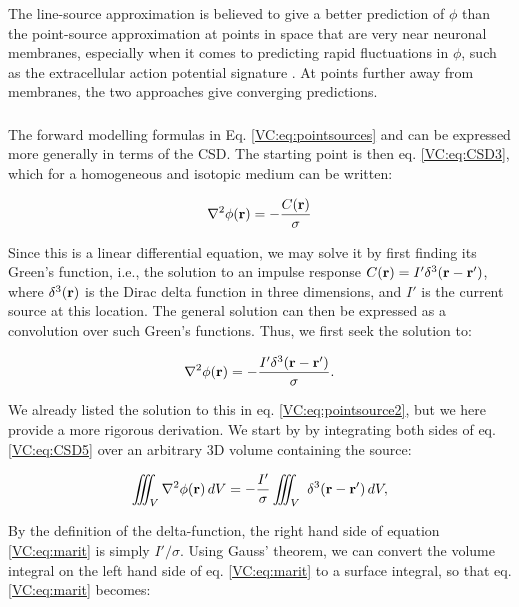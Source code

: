 The line-source approximation is believed to give a better prediction of $\phi$ than the point-source approximation at points in space that are very near neuronal membranes, especially when it comes to predicting rapid fluctuations in $\phi$, such as the extracellular action potential signature \citep{Holt1999}. At points further away from membranes, the two approaches give converging predictions.


\subsubsection{}
The forward modelling formulas in Eq. \ref{VC:eq:pointsources} and \label{VC:eq:linesources} can be expressed more generally in terms of the CSD. The starting point is then eq. \ref{VC:eq:CSD3}, which for a homogeneous and isotopic medium can be written: 

\begin{equation}
\nabla^2 \phi({\bf r}) = - \frac{C({\bf r})}{\sigma}
\label{VC:eq:CSD4}
\end{equation}

Since this is a linear differential equation, we may solve it by first finding its Green's function, i.e., the solution to an impulse response $C({\bf r}) = I' \delta^3({\bf r-r'})$, where $\delta^3({\bf r})$ is the Dirac delta function in three dimensions, and $I'$ is the current source at this location. The general solution can then be expressed as a convolution over such Green's functions. Thus, we first seek the solution to: 

\begin{equation}
\nabla^2 \phi({\bf r}) = - \frac{I' \delta^3({\bf r-r'})}{\sigma}.
\label{VC:eq:CSD5}
\end{equation}

We already listed the solution to this in eq. \ref{VC:eq:pointsource2}, but we here provide a more rigorous derivation. We start by by integrating both sides of eq. \ref{VC:eq:CSD5} over an arbitrary 3D volume containing the source:

\begin{equation}
\iiint_V \nabla^2\phi({\bf r}) \,dV =  - \frac{I'}{\sigma} \iiint_V \ \delta^3({\bf r-r'}) \, dV,
\label{VC:eq:marit}
\end{equation}

By the definition of the delta-function, the right hand side of equation \ref{VC:eq:marit} is simply $I'/\sigma$. Using Gauss' theorem, we can convert the volume integral on the left hand side of eq. \ref{VC:eq:marit} to a surface integral, so that eq. \ref{VC:eq:marit} becomes:

